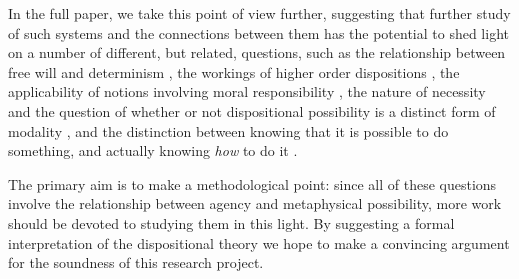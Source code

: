 \documentclass{article}
\begin{document}
In the full paper, we take this point of view further, suggesting that further study of such systems and the connections between them has the potential to shed light on a number of different, but related, questions, such as the relationship between free will and determinism \cite{Listfree,strawsonfree}, the workings of higher order dispositions \cite{dispmod}, the applicability of notions involving moral responsibility \cite{frankfurt,mensrea}, the nature of necessity and the question of whether or not dispositional possibility is a distinct form of modality \cite{DM,EaM,Los}, and the distinction between knowing that it is possible to do something, and actually knowing \emph{how} to do it \cite{atlhow,atlhowto}.

The primary aim is to make a methodological point: since all of these questions involve the relationship between agency and metaphysical possibility, more work should be devoted to studying them in this light. By suggesting a formal interpretation of the dispositional theory we hope to make a convincing argument for the soundness of this research project.



\end{document}
